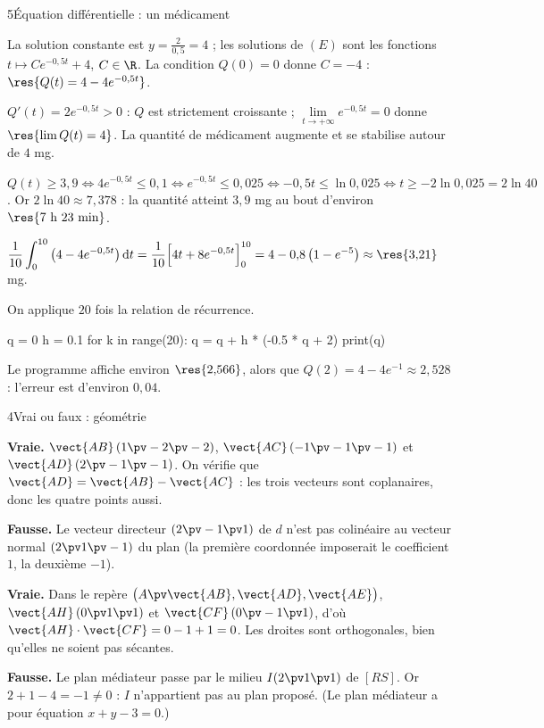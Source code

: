 \begin{corrigeBac}{5}{Équation différentielle : un médicament}
\begin{questions}
  \item La solution constante est $y=\frac{2}{0{,}5}=4$ ; les solutions de $(E)$ sont les fonctions $t\mapsto Ce^{-0{,}5t}+4$, $C\in\R$.
    La condition $Q(0)=0$ donne $C=-4$ : $\res{Q(t)=4-4e^{-0{,}5t}}$. 
  \item $Q'(t)=2e^{-0{,}5t}>0$ : $Q$ est strictement croissante ; $\lim\limits_{t\to+\infty}e^{-0{,}5t}=0$ donne $\res{\lim Q(t)=4}$. La
    quantité de médicament augmente et se stabilise autour de $4$ mg. 
  \item $Q(t)\geq3{,}9\iff4e^{-0{,}5t}\leq0{,}1\iff e^{-0{,}5t}\leq0{,}025\iff-0{,}5t\leq\ln0{,}025\iff t\geq-2\ln0{,}025=2\ln40$.
    Or $2\ln40\approx7{,}378$ : la quantité atteint $3{,}9$ mg au bout d'environ $\res{7\text{ h }23\text{ min}}$. \pts{1 pt}
  \item $\dfrac1{10}\displaystyle\int_0^{10}\left(4-4e^{-0{,}5t}\right)\mathrm{d}t=\dfrac1{10}\Big[4t+8e^{-0{,}5t}\Big]_0^{10}
    =4-0{,}8\left(1-e^{-5}\right)\approx\res{3{,}21}$ mg. \pts{1 pt}
  \item On applique $20$ fois la relation de récurrence.
\begin{codecote}[0.46]
\begin{pythoncol}
q = 0
h = 0.1
for k in range(20):
    q = q + h * (-0.5 * q + 2)
print(q)
\end{pythoncol}
\cote
Le programme affiche environ $\res{2{,}566}$, alors que $Q(2)=4-4e^{-1}\approx2{,}528$ : l'erreur est d'environ $0{,}04$.
\end{codecote}
    \pts{1 pt}
\end{questions}
\end{corrigeBac}

\begin{corrigeBac}{4}{Vrai ou faux : géométrie}
\begin{questions}
  \item \textbf{Vraie.} $\vect{AB}\,(1\pv-2\pv-2)$, $\vect{AC}\,(-1\pv-1\pv-1)$ et $\vect{AD}\,(2\pv-1\pv-1)$. On vérifie que
    $\vect{AD}=\vect{AB}-\vect{AC}$ : les trois vecteurs sont coplanaires, donc les quatre points aussi. \pts{1 pt}
  \item \textbf{Fausse.} Le vecteur directeur $(2\pv-1\pv1)$ de $d$ n'est pas colinéaire au vecteur normal $(2\pv1\pv-1)$ du plan
    (la première coordonnée imposerait le coefficient $1$, la deuxième $-1$). \pts{1 pt}
  \item \textbf{Vraie.} Dans le repère $\big(A\pv\vect{AB},\vect{AD},\vect{AE}\big)$, $\vect{AH}\,(0\pv1\pv1)$ et $\vect{CF}\,(0\pv-1\pv1)$, d'où
    $\vect{AH}\cdot\vect{CF}=0-1+1=0$. Les droites sont orthogonales, bien qu'elles ne soient pas sécantes. \pts{1 pt}
  \item \textbf{Fausse.} Le plan médiateur passe par le milieu $I(2\pv1\pv1)$ de $[RS]$. Or $2+1-4=-1\neq0$ : $I$ n'appartient pas au plan
    proposé. (Le plan médiateur a pour équation $x+y-3=0$.) \pts{1 pt}
\end{questions}
\end{corrigeBac}

